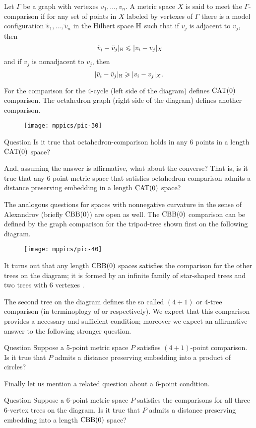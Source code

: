 \documentclass{article}
\begin{document}
Let $\Gamma$ be a graph with vertexes $v_1,\dots,v_n$.
A metric space $X$ is said to meet the $\Gamma$-comparison if for any set of points in $X$ labeled by vertexes of $\Gamma$ there is a model configuration $\tilde v_1,\dots,\tilde v_n$ in the Hilbert space $\mathbb H$ such that 
if $v_j$ is adjacent to $v_j$, then
\[|\tilde v_i-\tilde v_j|_{\mathbb H}\leqslant | v_i-v_j|_{X}\]
and
if $v_j$ is nonadjacent to $v_j$, then
\[|\tilde v_i-\tilde v_j|_{\mathbb H}\geqslant | v_i-v_j|_{X}.\]

For the comparison for the 4-cycle (left side of the diagram) defines $\mathrm{CAT}(0)$ comparison.
The octahedron graph (right side of the diagram) defines another comparison.

\begin{figure}[h!]
\vskip-0mm
\centering
\texttt{[image: mppics/pic-30]}
\end{figure}

\begin{thm}{Question}
Is it true that octahedron-comparison holds in any 6 points in a length $\mathrm{CAT}(0)$ space?

And, assuming the answer is affirmative, what about the converse? That is, is it true that any 6-point metric space that satisfies octahedron-comparison admits a distance preserving embedding in a length $\mathrm{CAT}(0)$ space?
\end{thm}


The analogous questions for  spaces with nonnegative curvature in the sense of Alexandrov (briefly $\mathrm{CBB}(0)$) are open as well.
The $\mathrm{CBB}(0)$ comparison can be defined by the graph comparison for the tripod-tree shown first on the following diagram.
\begin{figure}[h!]
\vskip-0mm
\centering
\texttt{[image: mppics/pic-40]}
\end{figure}
It turns out that any length $\mathrm{CBB}(0)$ spaces satisfies the comparison for the other trees on the diagram; it is formed by an infinite family of star-shaped trees and two trees with 6 vertexes \cite{alexander-kapovitch-petrunin-2011,lebedeva-petrunin-zolotov}.

The second tree on the diagram defines the so called $(4{+}1)$ or $4$-tree comparison (in terminoplogy of \cite{alexander-kapovitch-petrunin-2011} or \cite{lebedeva-petrunin-zolotov} respectively).
We expect that this comparison provides a necessary and sufficient condition; moreover we expect an affirmative answer to the following stronger question.


\begin{thm}{Question}
Suppose a 5-point metric space $P$ satisfies $(4{+}1)$-point comparison.
Is it true that $P$ admits a distance preserving embedding into a product of circles?
\end{thm}

Finally let us mention a related question about a 6-point condition. 

\begin{thm}{Question}
Suppose a 6-point metric space $P$ satisfies the comparisons for all three 6-vertex trees on the diagram.
Is it true that $P$ admits a distance preserving embedding into a length $\mathrm{CBB}(0)$ space?
\end{thm}

{\sloppy
\printbibliography[heading=bibintoc]
\fussy
}
\end{document}
